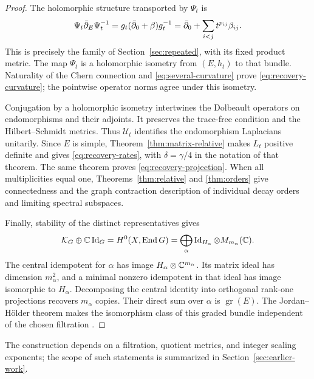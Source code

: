 \begin{proof}
The holomorphic structure transported by $\Psi_t$ is
\begin{equation}\label{eq:recovery-operator}
 \Psi_t\bar\partial_E\Psi_t^{-1}
 =g_t(\bar\partial_0+\beta)g_t^{-1}
 =\bar\partial_0+\sum_{i<j}t^{p_{ij}}\beta_{ij}.
\end{equation}
This is precisely the family of Section~\ref{sec:repeated}, with
its fixed product metric. The map $\Psi_t$ is a holomorphic
isometry from $(E,h_t)$ to that bundle. Naturality of the Chern
connection and \eqref{eq:several-curvature} prove
\eqref{eq:recovery-curvature}; the pointwise operator norms agree
under this isometry.

Conjugation by a holomorphic isometry intertwines the Dolbeault
operators on endomorphisms and their adjoints. It preserves the
trace-free condition and the Hilbert--Schmidt metrics. Thus
$\mathcal U_t$ identifies the endomorphism Laplacians unitarily.
Since $E$ is simple, Theorem~\ref{thm:matrix-relative} makes $L_t$
positive definite and gives \eqref{eq:recovery-rates}, with
$\delta=\gamma/4$ in the notation of that theorem.
The same theorem proves \eqref{eq:recovery-projection}. When all
multiplicities equal one, Theorems~\ref{thm:relative} and
\ref{thm:orders} give connectedness and the graph contraction
description of individual decay orders and limiting spectral subspaces.

Finally, stability of the distinct representatives gives
\[
 \mathcal K_G\oplus\mathbb C\operatorname{Id}_G
 =H^0(X,\operatorname{End} G)=\bigoplus_\alpha
     \operatorname{Id}_{H_\alpha}\otimes M_{m_\alpha}(\mathbb C).
\]
The central idempotent for $\alpha$ has image
$H_\alpha\otimes\mathbb C^{m_\alpha}$. Its matrix ideal has dimension
$m_\alpha^2$, and a minimal nonzero idempotent in that ideal has
image isomorphic to $H_\alpha$. Decomposing the central identity
into orthogonal rank-one projections recovers $m_\alpha$ copies.
Their direct sum over $\alpha$ is $\operatorname{gr}(E)$.
The Jordan--H\"older theorem makes
the isomorphism class of this graded bundle independent of the chosen
filtration \cite{Kobayashi1987}.
\end{proof}

The construction depends on a filtration, quotient metrics, and integer
scaling exponents; the scope of such statements is summarized in
Section~\ref{sec:earlier-work}.
